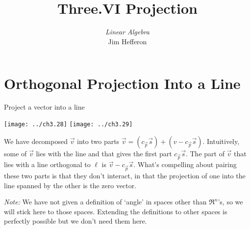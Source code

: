 \documentclass[9pt,t]{beamer}
\title[Projection] %
{Three.VI Projection}
\author{\textit{Linear Algebra} \\ {\small Jim Hef{}feron}}
\institute{
  \texttt{http://joshua.smcvt.edu/linearalgebra}
}
\date{}
\begin{document}
\begin{frame}
  \titlepage
\end{frame}




\section{Orthogonal Projection Into a Line}
\begin{frame}{Project a vector into a line}
\begin{center}
  \texttt{[image: ../ch3.28]}
  \hspace*{0.6in}
  \texttt{[image: ../ch3.29]}      
\end{center}
\pause
{}

\pause
{}
\end{frame}




\begin{frame}
We have decomposed $\vec{v}$ into two parts
$\vec{v}=(c_{\vec{p}}\vec{s})+(v-c_{\vec{p}}\vec{s})$.
Intuitively, some of $\vec{v}$ lies with the line and that gives
the first part $c_{\vec{p}}\vec{s}$.
The part of $\vec{v}$ that lies with a line orthogonal to $\ell$
is $\vec{v}-c_{\vec{p}}\vec{s}$.
What's compelling about pairing these two parts 
is that they don't interact, in that the projection of one into the line
spanned by the other is the zero vector.

\pause\bigskip\noindent\textit{Note:} 
We have not given a 
definition of `angle' in spaces
other than $\Re^n$'s,
so we will stick here to those spaces.
Extending the definitions to other spaces is perfectly possible but
we don't need them here.
\end{frame}
\end{document}
